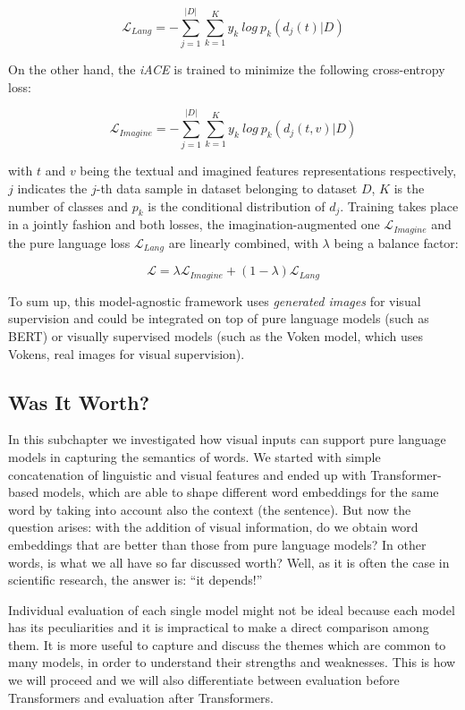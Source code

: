 \documentclass[
]{krantz}
\begin{document}
\[ \mathcal{L}_{Lang}=-\sum_{j=1}^{|D|}\sum_{k=1}^{K}y_{k}\ log\ p_{k}(d_{j}(t)|D) \]

On the other hand, the \emph{iACE} is trained to minimize the following cross-entropy loss:

\[ \mathcal{L}_{Imagine}=-\sum_{j=1}^{|D|}\sum_{k=1}^{K}y_{k}\ log\ p_{k}(d_{j}(t,v)|D) \]

with \(t\) and \(v\) being the textual and imagined features representations respectively, \(j\) indicates the \(j\)-th data sample in dataset belonging to dataset \(D\), \(K\) is the number of classes and \(p_k\) is the conditional distribution of \(d_j\).
Training takes place in a jointly fashion and both losses, the imagination-augmented one \(\mathcal{L}_{Imagine}\) and the pure language loss \(\mathcal{L}_{Lang}\) are linearly combined, with \(\lambda\) being a balance factor:

\[\mathcal{L}=\lambda\mathcal{L}_{Imagine}+(1-\lambda)\mathcal{L}_{Lang} \]

To sum up, this model-agnostic framework uses \emph{generated images} for visual supervision and could be integrated on top of pure language models (such as BERT) or visually supervised models (such as the Voken model, which uses Vokens, real images for visual supervision).

\hypertarget{was-it-worth}{%
\subsection{Was It Worth?}\label{was-it-worth}}

In this subchapter we investigated how visual inputs can support pure language models in capturing the semantics of words. We started with simple concatenation of linguistic and visual features and ended up with Transformer-based models, which are able to shape different word embeddings for the same word by taking into account also the context (the sentence). But now the question arises: with the addition of visual information, do we obtain word embeddings that are better than those from pure language models? In other words, is what we all have so far discussed worth? Well, as it is often the case in scientific research, the answer is: ``it depends!''

Individual evaluation of each single model might not be ideal because each model has its peculiarities and it is impractical to make a direct comparison among them. It is more useful to capture and discuss the themes which are common to many models, in order to understand their strengths and weaknesses. This is how we will proceed and we will also differentiate between evaluation before Transformers and evaluation after Transformers.
\end{document}
